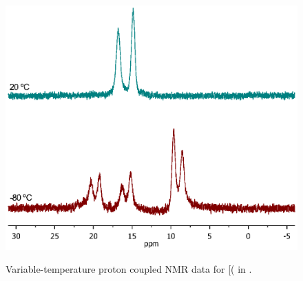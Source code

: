 \begin{figure}[htp]
\begin{center}
\vspace{0.5cm}
\includegraphics[scale = 0.8, trim = 0cm 8cm 0.5cm 10cm, clip]{../NMR/Coupledstacked.eps}
\caption[Variable temperature proton-coupled \phosphorus{} NMR spectra for [(\tButhixantphos\ce{)H]+}]{Variable-temperature proton coupled \phosphorus{} NMR data for [(\tButhixantphos\ce{)H]+} in .}
\vspace{0.2cm}
\label{VTStBuHcoupled}
\end{center}
\end{figure}  
\vspace{0.2cm}




